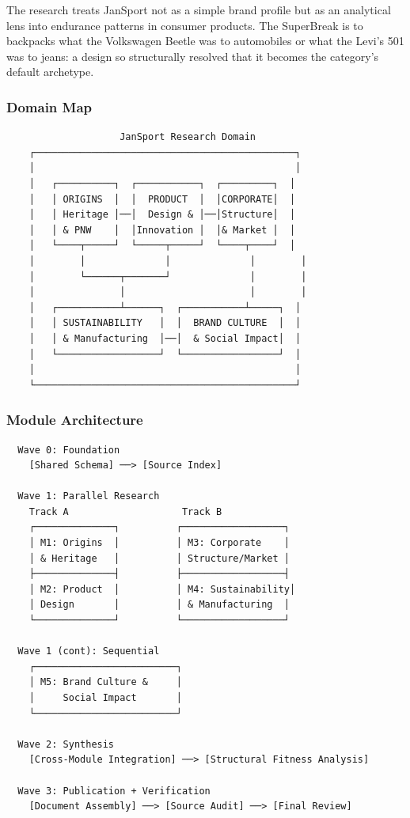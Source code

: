 \documentclass[11pt,letterpaper]{article}
\begin{document}
The research treats JanSport not as a simple brand profile but as an analytical lens into endurance patterns in consumer products. The SuperBreak is to backpacks what the Volkswagen Beetle was to automobiles or what the Levi's 501 was to jeans: a design so structurally resolved that it becomes the category's default archetype.

\subsubsection{Domain Map}

\begin{asciibox}
\begin{verbatim}
                    JanSport Research Domain
    ┌──────────────────────────────────────────────┐
    │                                              │
    │   ┌──────────┐  ┌───────────┐  ┌─────────┐  │
    │   │ ORIGINS  │  │  PRODUCT  │  │CORPORATE│  │
    │   │ Heritage │──│  Design & │──│Structure│  │
    │   │ & PNW    │  │Innovation │  │& Market │  │
    │   └────┬─────┘  └─────┬─────┘  └────┬────┘  │
    │        │              │              │        │
    │        └──────┬───────┘              │        │
    │               │                      │        │
    │   ┌───────────┴──────┐  ┌───────────┴─────┐  │
    │   │ SUSTAINABILITY   │  │  BRAND CULTURE  │  │
    │   │ & Manufacturing  │──│  & Social Impact│  │
    │   └──────────────────┘  └─────────────────┘  │
    │                                              │
    └──────────────────────────────────────────────┘
\end{verbatim}
\end{asciibox}

\subsubsection{Module Architecture}

\begin{asciibox}
\begin{verbatim}
  Wave 0: Foundation
    [Shared Schema] ──> [Source Index]

  Wave 1: Parallel Research
    Track A                    Track B
    ┌──────────────┐          ┌──────────────────┐
    │ M1: Origins  │          │ M3: Corporate    │
    │ & Heritage   │          │ Structure/Market │
    ├──────────────┤          ├──────────────────┤
    │ M2: Product  │          │ M4: Sustainability│
    │ Design       │          │ & Manufacturing  │
    └──────────────┘          └──────────────────┘

  Wave 1 (cont): Sequential
    ┌─────────────────────────┐
    │ M5: Brand Culture &     │
    │     Social Impact       │
    └─────────────────────────┘

  Wave 2: Synthesis
    [Cross-Module Integration] ──> [Structural Fitness Analysis]

  Wave 3: Publication + Verification
    [Document Assembly] ──> [Source Audit] ──> [Final Review]
\end{verbatim}
\end{asciibox}
\end{document}
